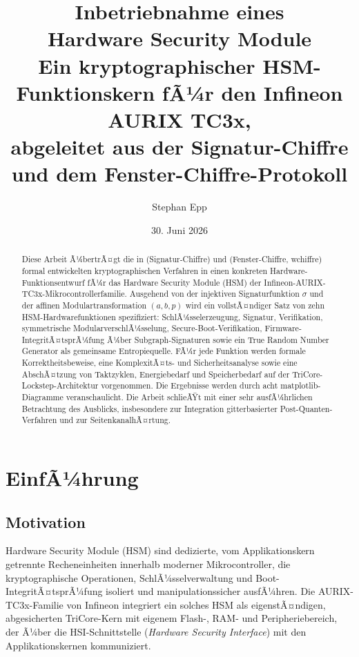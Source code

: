 ﻿\documentclass[a4paper,12pt]{article}
\title{\textbf{Inbetriebnahme eines}\\[0.2em]\textbf{Hardware Security Module}\\[0.3em]
\large Ein kryptographischer HSM-Funktionskern fÃ¼r den Infineon AURIX TC3x,\\
abgeleitet aus der Signatur-Chiffre und dem Fenster-Chiffre-Protokoll}
\author{Stephan Epp}
\date{30. Juni 2026}
\theoremstyle{definition}
\begin{document}
\maketitle

\begin{abstract}
\noindent
Diese Arbeit Ã¼bertrÃ¤gt die in \cite{Epp26b} (Signatur-Chiffre) und \cite{Epp26c} (Fenster-Chiffre, wchiffre) formal entwickelten kryptographischen Verfahren in einen konkreten Hardware-Funktionsentwurf fÃ¼r das Hardware Security Module (HSM) der Infineon-AURIX-TC3x-Mikrocontrollerfamilie. Ausgehend von der injektiven Signaturfunktion $\sigma$ und der affinen Modulartransformation $(a,b,p)$ wird ein vollstÃ¤ndiger Satz von zehn HSM-Hardwarefunktionen spezifiziert: SchlÃ¼sselerzeugung, Signatur, Verifikation, symmetrische ModularverschlÃ¼sselung, Secure-Boot-Verifikation, Firmware-IntegritÃ¤tsprÃ¼fung Ã¼ber Subgraph-Signaturen sowie ein True Random Number Generator als gemeinsame Entropiequelle. FÃ¼r jede Funktion werden formale Korrektheitsbeweise, eine KomplexitÃ¤ts- und Sicherheitsanalyse sowie eine AbschÃ¤tzung von Taktzyklen, Energiebedarf und Speicherbedarf auf der TriCore-Lockstep-Architektur vorgenommen. Die Ergebnisse werden durch acht matplotlib-Diagramme veranschaulicht. Die Arbeit schlieÃŸt mit einer sehr ausfÃ¼hrlichen Betrachtung des Ausblicks, insbesondere zur Integration gitterbasierter Post-Quanten-Verfahren und zur SeitenkanalhÃ¤rtung.
\end{abstract}

\tableofcontents
\newpage

\section{EinfÃ¼hrung}

\subsection{Motivation}

Hardware Security Module (HSM) sind dedizierte, vom Applikationskern getrennte Recheneinheiten innerhalb moderner Mikrocontroller, die kryptographische Operationen, SchlÃ¼sselverwaltung und Boot-IntegritÃ¤tsprÃ¼fung isoliert und manipulationssicher ausfÃ¼hren. Die AURIX-TC3x-Familie von Infineon integriert ein solches HSM als eigenstÃ¤ndigen, abgesicherten TriCore-Kern mit eigenem Flash-, RAM- und Peripheriebereich, der Ã¼ber die HSI-Schnittstelle (\emph{Hardware Security Interface}) mit den Applikationskernen kommuniziert.
\end{document}
